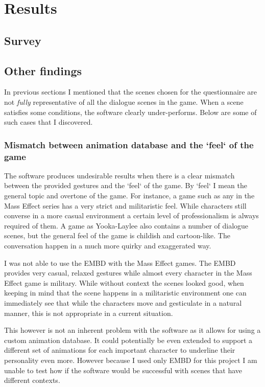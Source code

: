 \chapter{Results \label{chap:results}}

\section{Survey}



\section{Other findings \label{sec:otherfindings}}
In previous sections I mentioned that the scenes chosen for the questionnaire are not \textit{fully} representative of all the dialogue scenes in the game. When a scene satisfies some conditions, the software clearly under-performs. Below are some of such cases that I discovered.

\subsection{Mismatch between animation database and the `feel` of the game}
The software produces undesirable results when there is a clear mismatch between the provided gestures and the `feel` of the game. By `feel` I mean the general topic and overtone of the game. For instance, a game such as any in the Mass Effect series has a very strict and militaristic feel. While characters still converse in a more casual environment a certain level of professionalism is always required of them. A game as Yooka-Laylee also contains a number of dialogue scenes, but the general feel of the game is childish and cartoon-like. The conversation happen in a much more quirky and exaggerated way.

I was not able to use the EMBD with the Mass Effect games. The EMBD provides very casual, relaxed gestures while almost every character in the Mass Effect game is military. While without context the scenes looked good, when keeping in mind that the scene happens in a militaristic environment one can immediately see that while the characters move and gesticulate in a natural manner, this is not appropriate in a current situation.

This however is not an inherent problem with the software as it allows for using a custom animation database. It could potentially be even extended to support a different set of animations for each important character to underline their personality even more. However because I used only EMBD for this project I am unable to test how if the software would be successful with scenes that have different contexts.

